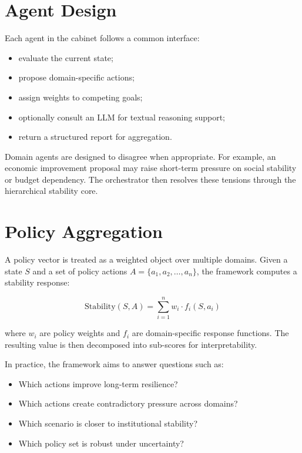 \documentclass[11pt,a4paper]{article}
\begin{document}
\section{Agent Design}

Each agent in the cabinet follows a common interface:

\begin{itemize}[leftmargin=1.5em]
    \item evaluate the current state;
    \item propose domain-specific actions;
    \item assign weights to competing goals;
    \item optionally consult an LLM for textual reasoning support;
    \item return a structured report for aggregation.
\end{itemize}

Domain agents are designed to disagree when appropriate. For example, an economic improvement proposal may raise short-term pressure on social stability or budget dependency. The orchestrator then resolves these tensions through the hierarchical stability core.

\section{Policy Aggregation}

A policy vector is treated as a weighted object over multiple domains. Given a state $S$ and a set of policy actions $A = \{a_1, a_2, \ldots, a_n\}$, the framework computes a stability response:

\[
\mathrm{Stability}(S, A) = \sum_{i=1}^{n} w_i \cdot f_i(S, a_i)
\]

where $w_i$ are policy weights and $f_i$ are domain-specific response functions. The resulting value is then decomposed into sub-scores for interpretability.

In practice, the framework aims to answer questions such as:

\begin{itemize}[leftmargin=1.5em]
    \item Which actions improve long-term resilience?
    \item Which actions create contradictory pressure across domains?
    \item Which scenario is closer to institutional stability?
    \item Which policy set is robust under uncertainty?
\end{itemize}
\end{document}
